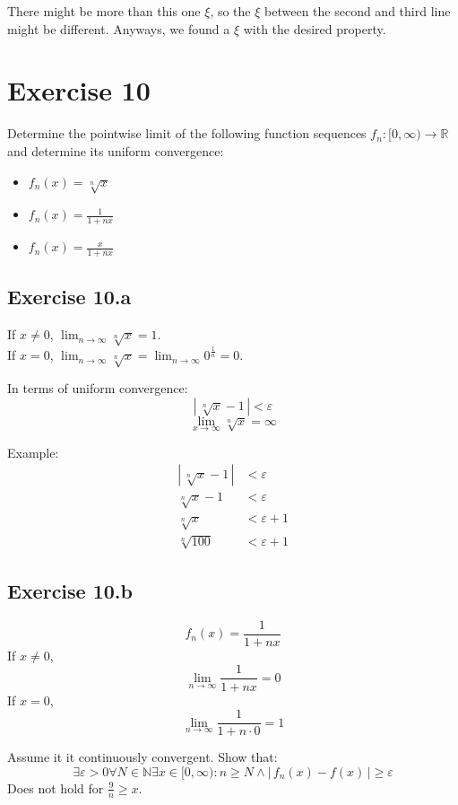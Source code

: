 \documentclass[a4paper]{article}
\theoremstyle{definition}
\newcommand\abs[1]{\left|\,#1\,\right|}
\begin{document}
There might be more than this one $\xi$, so the $\xi$ between the second and third line might be different.
Anyways, we found a $\xi$ with the desired property.

\section{Exercise 10}
\begin{ex}
  Determine the pointwise limit of the following function sequences $f_n: [0,\infty) \to \mathbb R$
  and determine its uniform convergence:
  \begin{itemize}
    \item $f_n(x) = \sqrt[n]{x}$
    \item $f_n(x) = \frac{1}{1 + nx}$
    \item $f_n(x) = \frac{x}{1 + nx}$
  \end{itemize}
\end{ex}

\subsection{Exercise 10.a}
%
If $x \neq 0$, $\lim_{n\to\infty} \sqrt[n]{x} = 1$. \\
If $x = 0$, $\lim_{n\to\infty} \sqrt[n]{x} = \lim_{n\to\infty} 0^{\frac 1n} = 0$.

In terms of uniform convergence:
\[ \abs{\sqrt[n]{x} - 1} < \varepsilon \]
\[ \lim_{x\to\infty} \sqrt[n]{x} = \infty \]

Example:
\begin{align*}
  \abs{\sqrt[n]{x} - 1} &< \varepsilon \\
  \sqrt[n]{x} - 1 &< \varepsilon \\
  \sqrt[n]{x} &< \varepsilon + 1 \\
  \sqrt[n]{100} &< \varepsilon + 1
\end{align*}

\subsection{Exercise 10.b}
%
\[ f_n(x) = \frac{1}{1 + nx} \]
If $x \neq 0$,
\[ \lim_{n\to\infty} \frac{1}{1 + nx} = 0 \]
If $x = 0$,
\[ \lim_{n\to\infty} \frac{1}{1 + n\cdot 0} = 1 \]

Assume it it continuously convergent. Show that:
\[ \exists \varepsilon > 0 \forall N \in \mathbb N \exists x \in [0,\infty): n \geq N \land \abs{f_n(x) - f(x)} \geq \varepsilon \]
Does not hold for $\frac 9n \geq x$.
\end{document}
